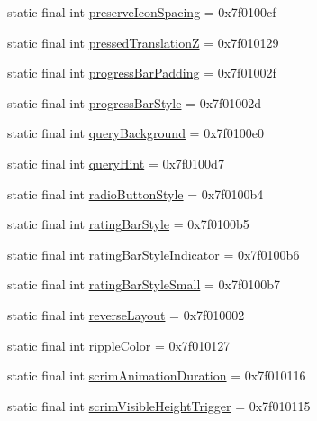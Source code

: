 \begin{CompactItemize}
\item 
static final int \hyperlink{classandroid_1_1support_1_1v7_1_1palette_1_1_r_1_1attr_2618bd35a061b96551dfd150ae7ec17c}{preserveIconSpacing} = 0x7f0100cf
\item 
static final int \hyperlink{classandroid_1_1support_1_1v7_1_1palette_1_1_r_1_1attr_ce71d533ea8dd22edaf6c22b74c98542}{pressedTranslationZ} = 0x7f010129
\item 
static final int \hyperlink{classandroid_1_1support_1_1v7_1_1palette_1_1_r_1_1attr_11d4567b59fc56b11f69165748dcabb2}{progressBarPadding} = 0x7f01002f
\item 
static final int \hyperlink{classandroid_1_1support_1_1v7_1_1palette_1_1_r_1_1attr_218b40c3869681e56fcc354514e682f6}{progressBarStyle} = 0x7f01002d
\item 
static final int \hyperlink{classandroid_1_1support_1_1v7_1_1palette_1_1_r_1_1attr_d446f866c19ee45b433cf942b6994f98}{queryBackground} = 0x7f0100e0
\item 
static final int \hyperlink{classandroid_1_1support_1_1v7_1_1palette_1_1_r_1_1attr_6ef3fa5c88a9b0fb52c8cacb7cb51a72}{queryHint} = 0x7f0100d7
\item 
static final int \hyperlink{classandroid_1_1support_1_1v7_1_1palette_1_1_r_1_1attr_9ef2cabd44fefa12b6a9a78db5a005a8}{radioButtonStyle} = 0x7f0100b4
\item 
static final int \hyperlink{classandroid_1_1support_1_1v7_1_1palette_1_1_r_1_1attr_67540336c711eb571908be2161faf648}{ratingBarStyle} = 0x7f0100b5
\item 
static final int \hyperlink{classandroid_1_1support_1_1v7_1_1palette_1_1_r_1_1attr_6a7f21ba3a54640088627e269bda4e99}{ratingBarStyleIndicator} = 0x7f0100b6
\item 
static final int \hyperlink{classandroid_1_1support_1_1v7_1_1palette_1_1_r_1_1attr_560155167c4b914f52647e0cb2c39c8c}{ratingBarStyleSmall} = 0x7f0100b7
\item 
static final int \hyperlink{classandroid_1_1support_1_1v7_1_1palette_1_1_r_1_1attr_624e21738eff5350619edce8d52efd84}{reverseLayout} = 0x7f010002
\item 
static final int \hyperlink{classandroid_1_1support_1_1v7_1_1palette_1_1_r_1_1attr_f313eca59fde4934f2daf6b8c79227af}{rippleColor} = 0x7f010127
\item 
static final int \hyperlink{classandroid_1_1support_1_1v7_1_1palette_1_1_r_1_1attr_3bf0c1f53e9712ff9c0448e1528b8496}{scrimAnimationDuration} = 0x7f010116
\item 
static final int \hyperlink{classandroid_1_1support_1_1v7_1_1palette_1_1_r_1_1attr_1707058159b7f9972673f5a5e0d3e6e8}{scrimVisibleHeightTrigger} = 0x7f010115

\end{CompactItemize}
